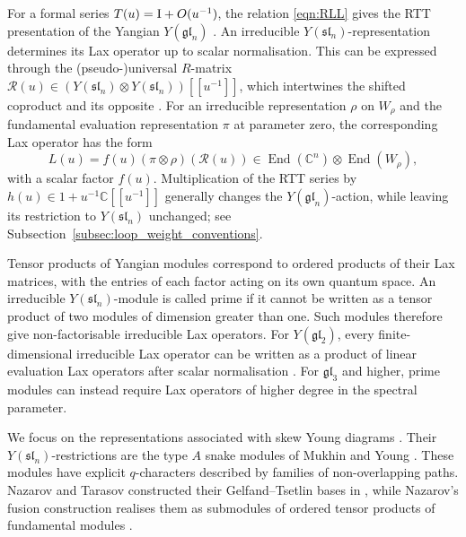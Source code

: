 \documentclass[12pt,reqno]{amsart}
\newcommand{\C}{{\mathbb C}}
\newcommand{\id}{{\rm I}}
\numberwithin{equation}{section}
\begin{document}
		For a formal series $T(u)=\id+O(u^{-1})$, the relation
		\eqref{eqn:RLL} gives the RTT presentation of the Yangian
		$Y(\mathfrak{gl}_n)$ \cite{molev2007yangians}.
		An irreducible $Y(\mathfrak{sl}_n)$-representation determines its
		Lax operator up to scalar normalisation. This can be expressed
		through the (pseudo-)universal $R$-matrix
		$\mathcal R(u)\in
		(Y(\mathfrak{sl}_n)\otimes Y(\mathfrak{sl}_n))[[u^{-1}]]$,
		which intertwines the shifted coproduct and its opposite
		\cite{CPBook}. For an irreducible representation $\rho$ on
		$W_\rho$ and the fundamental evaluation representation $\pi$
		at parameter zero, the corresponding Lax operator has the form
		\begin{equation}
			L(u)=f(u)(\pi\otimes\rho)(\mathcal R(u))
			\in\operatorname{End}(\C^n)\otimes\operatorname{End}(W_\rho),
			\label{eqn:L_operator_irred}
		\end{equation}
		with a scalar factor $f(u)$. Multiplication of the RTT series by
		$h(u)\in1+u^{-1}\C[[u^{-1}]]$ generally changes the
		$Y(\mathfrak{gl}_n)$-action, while leaving its restriction to
		$Y(\mathfrak{sl}_n)$ unchanged; see
		Subsection~\ref{subsec:loop_weight_conventions}.
		
		Tensor products of Yangian modules correspond to ordered products
		of their Lax matrices, with the entries of each factor acting on
		its own quantum space. An irreducible $Y(\mathfrak{sl}_n)$-module
		is called prime if it cannot be written as a tensor product of
		two modules of dimension greater than one. Such modules therefore
		give non-factorisable irreducible Lax operators.
		For $Y(\mathfrak{gl}_2)$, every finite-dimensional irreducible
		Lax operator can be written as a product of linear evaluation
		Lax operators after scalar normalisation
		\cite[Section~4]{NT1998}. For $\mathfrak{gl}_3$ and higher,
		prime modules can instead require Lax operators of higher degree
		in the spectral parameter.
		
		We focus on the representations associated with skew Young
		diagrams \cite{NT1998,Nazarov2002}. Their
		$Y(\mathfrak{sl}_n)$-restrictions are the type $A$ snake modules
		of Mukhin and Young \cite{MY,MY2}. These modules have explicit
		$q$-characters described by families of non-overlapping paths.
		Nazarov and Tarasov constructed their Gelfand--Tsetlin bases in
		\cite{NT1998}, while Nazarov's fusion construction realises them
		as submodules of ordered tensor products of fundamental modules
		\cite{Nazarov2002}.
		
\end{document}
